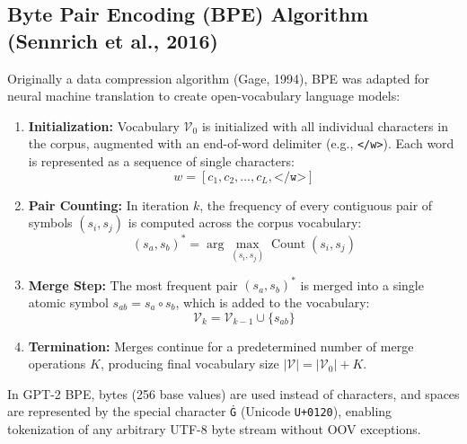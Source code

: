 \documentclass[12pt,a4paper]{report}
\begin{document}
\subsection{Byte Pair Encoding (BPE) Algorithm (Sennrich et al., 2016)}
Originally a data compression algorithm (Gage, 1994), BPE was adapted for neural machine translation to create open-vocabulary language models:
\begin{enumerate}
    \item \textbf{Initialization:} Vocabulary $\mathcal{V}_0$ is initialized with all individual characters in the corpus, augmented with an end-of-word delimiter (e.g., \texttt{</w>}). Each word is represented as a sequence of single characters:
    \begin{equation}
        w = [c_1, c_2, \dots, c_L, \texttt{</w>}]
    \end{equation}
    \item \textbf{Pair Counting:} In iteration $k$, the frequency of every contiguous pair of symbols $(s_i, s_j)$ is computed across the corpus vocabulary:
    \begin{equation}
        (s_a, s_b)^* = \arg\max_{(s_i, s_j)} \operatorname{Count}(s_i, s_j)
    \end{equation}
    \item \textbf{Merge Step:} The most frequent pair $(s_a, s_b)^*$ is merged into a single atomic symbol $s_{ab} = s_a \circ s_b$, which is added to the vocabulary:
    \begin{equation}
        \mathcal{V}_{k} = \mathcal{V}_{k-1} \cup \{s_{ab}\}
    \end{equation}
    \item \textbf{Termination:} Merges continue for a predetermined number of merge operations $K$, producing final vocabulary size $|\mathcal{V}| = |\mathcal{V}_0| + K$.
\end{enumerate}
In GPT-2 BPE, bytes (256 base values) are used instead of characters, and spaces are represented by the special character \texttt{Ġ} (Unicode \texttt{U+0120}), enabling tokenization of any arbitrary UTF-8 byte stream without OOV exceptions.
\end{document}
